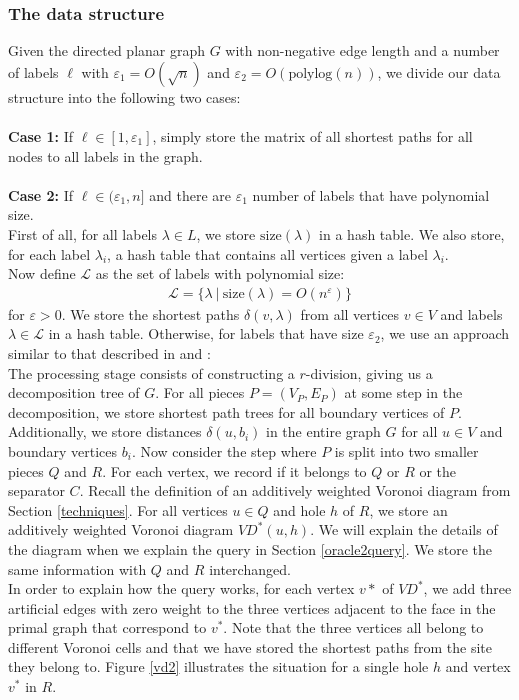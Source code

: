 \subsubsection{The data structure}
Given the directed planar graph $G$ with non-negative edge length and a number of labels $\ell$ with
$\varepsilon_1 = O(\sqrt{n})$ and $\varepsilon_2=O(\text{polylog}(n))$, we divide our
data structure into the following two cases: \\
\\
\textbf{Case 1:} If $\ell\in [1, \varepsilon_1]$, simply store the matrix of all shortest paths for all nodes to all
labels in the graph. \\
\\
\textbf{Case 2:} If $\ell\in (\varepsilon_1, n]$ and there are $\varepsilon_1$ number of labels that have
polynomial size. \\
First of all, for all labels
$\lambda\in L$, we
store $\text{size}(\lambda)$ in a hash table. We also store, for each label $\lambda_i$,
a hash table that contains all vertices given a label $\lambda_i$. \\
Now define $\mathcal{L}$ as the set of labels
with polynomial size:
\begin{align*}
  \mathcal{L}=\{\lambda\ |\ \text{size}(\lambda)=O(n^\varepsilon)\}
\end{align*}
for $\varepsilon>0$. We store the
shortest paths $\delta(v, \lambda)$ from all vertices $v\in V$ and labels $\lambda\in
\mathcal{L}$ in a hash table. Otherwise, for labels that have size
$\varepsilon_2$, we
use an approach similar to that described in \cite{cohen2017fast} and
\cite{gawrychowski2017better}: \\
\indent The processing stage consists of constructing a $r$-division,
giving us a decomposition tree of $G$. For all pieces $P=(V_P, E_P)$ at some
step in the decomposition, we store shortest path trees for all boundary vertices of $P$.
Additionally, we store distances $\delta(u,b_i)$ in the entire graph $G$ for all $u\in V$ and boundary vertices $b_i$. Now
consider the step where $P$ is split into two smaller pieces $Q$ and $R$. For each
vertex, we record if it belongs to $Q$ or $R$ or the separator $C$. Recall the definition of an
additively weighted Voronoi diagram from Section \ref{techniques}. For all vertices $u\in
Q$ and hole $h$ of $R$, we store an additively weighted
Voronoi diagram $VD^*(u,h)$. We will explain the details of the diagram when we explain
the query in Section \ref{oracle2query}. We store the
same information with $Q$ and $R$ interchanged. \\
In order to explain how the
query works, for each vertex $v*$ of $VD^*$, we add three artificial edges with zero
weight to the three vertices adjacent
to the face in the primal graph that correspond to $v^*$. Note that the three vertices all
belong to different Voronoi cells and that we have stored the shortest paths from the site they
belong to. Figure \ref{vd2} illustrates the
situation for a single hole $h$ and vertex $v^*$ in $R$.


